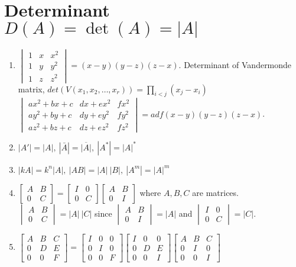 \section{Determinant $D(A) = \det(A) = |A|$}
\begin{enumerate}
	\item $\begin{vmatrix}1 & x & x^2 \\ 1 & y & y^2 \\ 1 & z & z^2 \end{vmatrix} = (x-y)(y-z)(z-x)$.
		\subitem Determinant of Vandermonde matrix, $det(V(x_1,x_2,\dots,x_r)) = \prod_{i < j} (x_j-x_i)$
		\subitem $\begin{vmatrix}ax^2+bx+c & dx+ex^2 & fx^2 \\ ay^2+by+c & dy+ey^2 & fy^2 \\ az^2+bz+c & dz+ez^2 & fz^2 \end{vmatrix} = adf(x-y)(y-z)(z-x)$.
	\item $|A'| = |A|,\ |\bar{A}|=\overline{|A|},\ |A^\ast| = |A|^\ast$
	\item $|kA| = k^n|A|,\ |AB| = |A|\ |B|,\ |A^m| = |A|^m$
	\item $\begin{bmatrix} A & B \\ 0 & C \end{bmatrix} = \begin{bmatrix} I & 0 \\ 0 & C \end{bmatrix} \begin{bmatrix} A & B \\ 0 & I \end{bmatrix}$ where $A,B,C$ are matrices.
	\subitem $\begin{vmatrix} A & B \\ 0 & C \end{vmatrix} = |A|\ |C|$ since $\begin{vmatrix} A & B \\ 0 & I \end{vmatrix} = |A|$ and $\begin{vmatrix} I & 0 \\ 0 & C \end{vmatrix} = |C|$.
	\item $\begin{bmatrix} A & B & C \\ 0 & D & E \\ 0 & 0 & F \end{bmatrix} = \begin{bmatrix} I & 0 & 0 \\ 0 & I & 0 \\ 0 & 0 & F \end{bmatrix}\begin{bmatrix} I & 0 & 0 \\ 0 & D & E \\ 0 & 0 & I \end{bmatrix} \begin{bmatrix} A & B & C \\ 0 & I & 0 \\ 0 & 0 & I \end{bmatrix}$

\end{enumerate}
